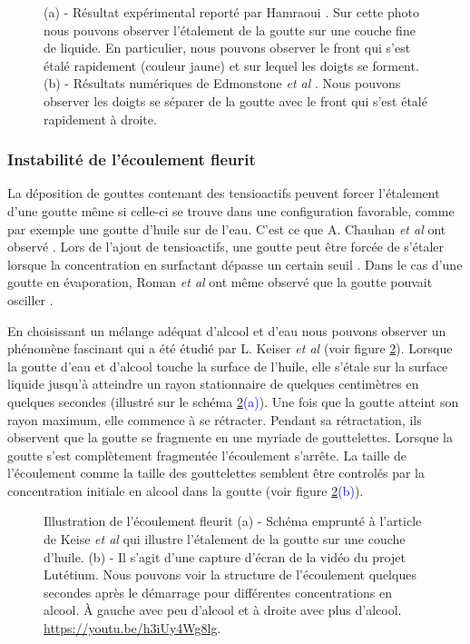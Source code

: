 \begin{figure}[!ht]
  \centering
  
  \caption{(a) - Résultat expérimental reporté par Hamraoui \cite{Hamraoui2004}. Sur cette photo nous pouvons observer l'étalement de la goutte sur une couche fine de liquide. En particulier, nous pouvons observer le front qui s'est étalé rapidement (couleur jaune) et sur lequel les doigts se forment. (b) - Résultats numériques de Edmonstone \textit{et al} \cite{Edmonstone2006}. Nous pouvons observer les doigts se séparer de la goutte avec le front qui s'est étalé rapidement à droite.}
  \label{fig:Hamraoui}
\end{figure}

\subsubsection{Instabilité de l'écoulement fleurit}

La déposition de gouttes contenant des tensioactifs peuvent forcer l'étalement d'une goutte même si celle-ci se trouve dans une configuration favorable, comme par exemple une goutte d'huile sur de l'eau. C'est ce que A. Chauhan \textit{et al} ont observé \cite{Chauhan2000}. Lors de l'ajout de tensioactifs, une goutte peut être forcée de s'étaler lorsque la concentration en surfactant dépasse un certain seuil  \cite{Karapetsas2011}.  Dans le cas d'une goutte en évaporation, Roman \textit{et al} ont même observé que la goutte pouvait osciller \cite{Stocker2007}. 

En choisissant un mélange adéquat d'alcool et d'eau nous pouvons observer un phénomène fascinant qui a été étudié par L. Keiser \textit{et al} \cite{Keiser2017} (voir figure \ref{fig:EcoulementFleurit}). Lorsque la goutte d'eau et d'alcool touche la surface de l'huile, elle s'étale sur la surface liquide jusqu'à atteindre un rayon stationnaire de quelques centimètres en quelques secondes (illustré sur le schéma \ref{fig:EcoulementFleurit}\textcolor{blue}{(a)}). Une fois que la goutte atteint son rayon maximum, elle commence à se rétracter. Pendant sa rétractation, ils observent que la goutte se fragmente en une \og myriade \fg de gouttelettes. Lorsque la goutte s'est complètement fragmentée l'écoulement s'arrête. La taille de l'écoulement comme la taille des gouttelettes semblent être controlés par la concentration initiale en alcool dans la goutte (voir figure \ref{fig:EcoulementFleurit}\textcolor{blue}{(b)}).
\begin{figure}[!ht]
  \centering
  
  \caption{Illustration de l'écoulement fleurit (a) - Schéma emprunté à l'article de Keise \textit{et al} \cite{Keiser2017} qui illustre l'étalement de la goutte sur une couche d'huile. (b) - Il s'agit d'une capture d'écran de la vidéo du projet Lutétium. Nous pouvons voir la structure de l'écoulement quelques secondes après le démarrage pour différentes concentrations en alcool. À gauche avec peu d'alcool et à droite avec plus d'alcool. \url{https://youtu.be/h3iUy4Wg8lg}. }
  \label{fig:EcoulementFleurit}
\end{figure}

